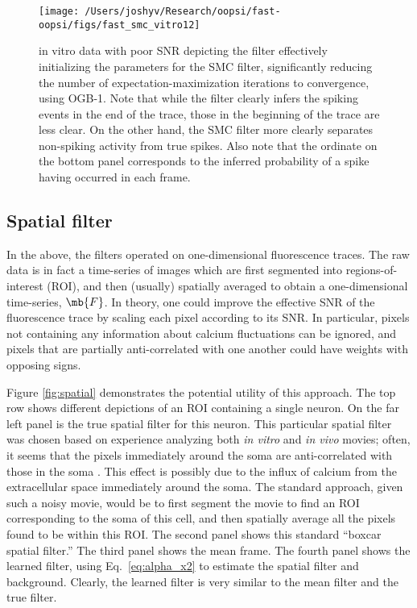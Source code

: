 \begin{figure}[h!]
\centering \texttt{[image: /Users/joshyv/Research/oopsi/fast-oopsi/figs/fast\_smc\_vitro12]}
\caption[\foopsi filter can initialize Wiener filter]{in vitro data with poor SNR depicting the \foopsi filter effectively initializing the parameters for the SMC filter, significantly reducing the number of expectation-maximization iterations to convergence, using OGB-1.  Note that while the \foopsi filter clearly infers the spiking events in the end of the trace, those in the beginning of the trace are less clear.  On the other hand, the SMC filter more clearly separates non-spiking activity from true spikes.  Also note that the ordinate on the bottom panel corresponds to the inferred probability of a spike having occurred in each frame.} \label{fig:smc_init}
\end{figure}

\subsection{Spatial filter} \label{sec:results:spatial}

In the above, the filters operated on one-dimensional fluorescence traces. The raw data is in fact a time-series of images which are first segmented into regions-of-interest (ROI), and then (usually) spatially averaged to obtain a one-dimensional time-series, $\mb{F}$.  In theory, one could improve the effective SNR of the fluorescence trace by scaling each pixel according to its SNR.  In particular, pixels not containing any information about calcium fluctuations can be ignored, and pixels that are partially anti-correlated with one another could have weights with opposing signs.  

Figure \ref{fig:spatial} demonstrates the potential utility of this approach.  The top row shows different depictions of an ROI containing a single neuron.  On the far left panel is the true spatial filter for this neuron.  This particular spatial filter was chosen based on experience analyzing both \emph{in vitro} and \emph{in vivo} movies; often, it seems that the pixels immediately around the soma are anti-correlated with those in the soma \cite{MacLeanYuste05,WatsonYuste08}.  This effect is possibly due to the influx of calcium from the extracellular space immediately around the soma.   The standard approach, given such a noisy movie, would be to first segment the movie to find an ROI corresponding to the soma of this cell, and then spatially average all the pixels found to be within this ROI.  The second panel shows this standard ``boxcar spatial filter.''  The third panel shows the mean frame. The fourth panel shows the learned filter, using Eq.~\eqref{eq:alpha_x2} to estimate the spatial filter and background. Clearly, the learned filter is very similar to the mean filter and the true filter. 

